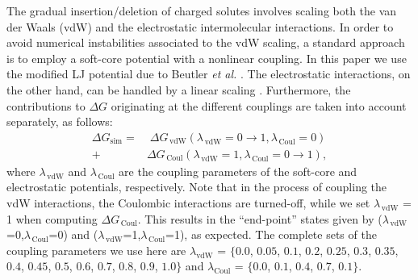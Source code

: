 \documentclass[3p,twocolumn]{elsarticle}
\begin{document}
The gradual insertion/deletion of charged solutes involves scaling both the van der Waals (vdW) and the electrostatic intermolecular interactions.
In order to avoid numerical instabilities associated to the vdW scaling, a standard approach is to employ a soft-core potential with a nonlinear coupling.
In this paper we use the modified LJ potential due to Beutler \textit{et al.} \cite{Beutler_1994}.
The electrostatic interactions, on the other hand, can be handled by a linear scaling \cite{Naden_2015}.
Furthermore, the contributions to $\Delta G$ originating at the different couplings are taken into account separately, as follows:
\begin{equation}
\begin{split}
\Delta G_{\text{sim}} =& \; \Delta G_{\,\text{vdW}} (\lambda_{\,\text{vdW}} = 0\rightarrow  1, \lambda_{\, \text{Coul}} = 0) \\
+ \; &\Delta G_{\,\text{Coul}} (\lambda_{\, \text{vdW}} = 1,\lambda_{\,\text{Coul}} = 0 \rightarrow 1),
\end{split}
\end{equation}
where $\lambda_{\,\text{vdW}}$ and $\lambda_{\,\text{Coul}}$ are the coupling parameters of the soft-core and electrostatic potentials, respectively.
Note that in the process of coupling the vdW interactions, the Coulombic interactions are turned-off, while we set $\lambda_{\,\text{vdW}}$ = 1 when computing $\Delta G_{\,\text{Coul}}$.
This results in the ``end-point'' states given by ($\lambda_{\,\text{vdW}}$=0,$\lambda_{\,\text{Coul}}$=0) and ($\lambda_{\,\text{vdW}}$=1,$\lambda_{\,\text{Coul}}$=1), as expected.
The complete sets of the coupling parameters we use here are $\lambda_{\text{vdW}}$ = $\{0.0$, $0.05$, $0.1$, $0.2$, $0.25$, $0.3$, $0.35$, $0.4$, $0.45$, $0.5$, $0.6$, $0.7$, $0.8$, $0.9$, $1.0\}$ and $\lambda_{\text{Coul}}$ = $\{0.0$, $0.1$, $0.4$, $0.7$, $0.1\}$.
\end{document}
